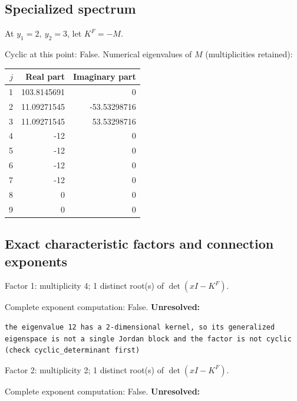\documentclass[10pt,a4paper]{article}
\newcommand{\fitmath}[1]{\sbox{\mathbox}{$\displaystyle #1$}\ifdim\wd\mathbox>\linewidth\resizebox{\linewidth}{!}{\usebox{\mathbox}}\else\usebox{\mathbox}\fi}
\begin{document}
\subsection*{Specialized spectrum}
At $y_1=2,\ y_2=3$, let $K^F=-M$.
\begin{center}\fitmath{\Delta=0}\end{center}
Cyclic at this point: False.
Numerical eigenvalues of $M$ (multiplicities retained):
\begin{center}\small\begin{tabular}{rrr}\toprule $j$ & Real part & Imaginary part\\\midrule
1 & 103.8145691 & 0\\
2 & 11.09271545 & -53.53298716\\
3 & 11.09271545 & 53.53298716\\
4 & -12 & 0\\
5 & -12 & 0\\
6 & -12 & 0\\
7 & -12 & 0\\
8 & 0 & 0\\
9 & 0 & 0\\
\bottomrule\end{tabular}\end{center}
\subsection*{Exact characteristic factors and connection exponents}
Factor 1: multiplicity 4; 1 distinct root(s) of $\det(xI-K^F)$.
\begin{center}\fitmath{\begin{aligned}p_{1}(x)&=x - 12\end{aligned}}\end{center}
Complete exponent computation: False.
\textbf{Unresolved:}

\begin{lstlisting}
the eigenvalue 12 has a 2-dimensional kernel, so its generalized eigenspace is not a single Jordan block and the factor is not cyclic (check cyclic_determinant first)
\end{lstlisting}

Factor 2: multiplicity 2; 1 distinct root(s) of $\det(xI-K^F)$.
\begin{center}\fitmath{\begin{aligned}p_{2}(x)&=x\end{aligned}}\end{center}
Complete exponent computation: False.
\textbf{Unresolved:}
\end{document}
